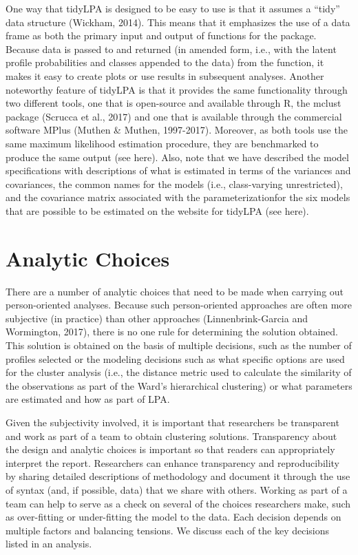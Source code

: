 \documentclass[man]{apa6}
\begin{document}
One way that tidyLPA is designed to be easy to use is that it assumes a
\enquote{tidy} data structure (Wickham, 2014). This means that it
emphasizes the use of a data frame as both the primary input and output
of functions for the package. Because data is passed to and returned (in
amended form, i.e., with the latent profile probabilities and classes
appended to the data) from the function, it makes it easy to create
plots or use results in subsequent analyses. Another noteworthy feature
of tidyLPA is that it provides the same functionality through two
different tools, one that is open-source and available through R, the
mclust package (Scrucca et al., 2017) and one that is available through
the commercial software MPlus (Muthen \& Muthen, 1997-2017). Moreover,
as both tools use the same maximum likelihood estimation procedure, they
are benchmarked to produce the same output (see here). Also, note that
we have described the model specifications with descriptions of what is
estimated in terms of the variances and covariances, the common names
for the models (i.e., class-varying unrestricted), and the covariance
matrix associated with the parameterizationfor the six models that are
possible to be estimated on the website for tidyLPA (see here).

\section{Analytic Choices}\label{analytic-choices}

There are a number of analytic choices that need to be made when
carrying out person-oriented analyses. Because such person-oriented
approaches are often more subjective (in practice) than other approaches
(Linnenbrink-Garcia and Wormington, 2017), there is no one rule for
determining the solution obtained. This solution is obtained on the
basis of multiple decisions, such as the number of profiles selected or
the modeling decisions such as what specific options are used for the
cluster analysis (i.e., the distance metric used to calculate the
similarity of the observations as part of the Ward's hierarchical
clustering) or what parameters are estimated and how as part of LPA.

Given the subjectivity involved, it is important that researchers be
transparent and work as part of a team to obtain clustering solutions.
Transparency about the design and analytic choices is important so that
readers can appropriately interpret the report. Researchers can enhance
transparency and reproducibility by sharing detailed descriptions of
methodology and document it through the use of syntax (and, if possible,
data) that we share with others. Working as part of a team can help to
serve as a check on several of the choices researchers make, such as
over-fitting or under-fitting the model to the data. Each decision
depends on multiple factors and balancing tensions. We discuss each of
the key decisions listed in an analysis.
\end{document}
